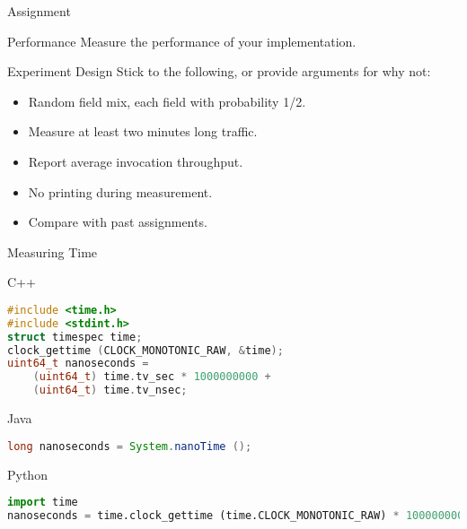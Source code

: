 \begin{frame}{Assignment}
    \begin{block}{Performance}
        Measure the performance of your implementation.
    \end{block}

    \bigskip

    \begin{block}{Experiment Design}
        Stick to the following, or provide arguments for why not:
        \begin{itemize}
            \item Random field mix, each field with probability 1/2.
            \item Measure at least two minutes long traffic.
            \item Report average invocation throughput.
            \item No printing during measurement.
            \item Compare with past assignments.
        \end{itemize}
    \end{block}
\end{frame}


\begin{frame}[fragile]{Measuring Time}
    \begin{block}{C++}
\begin{lstlisting}[language=c,style=mini]
#include <time.h>
#include <stdint.h>
struct timespec time;
clock_gettime (CLOCK_MONOTONIC_RAW, &time);
uint64_t nanoseconds =
    (uint64_t) time.tv_sec * 1000000000 +
    (uint64_t) time.tv_nsec;
\end{lstlisting}
    \end{block}
    \begin{block}{Java}
\begin{lstlisting}[language=java,style=mini]
long nanoseconds = System.nanoTime ();
\end{lstlisting}
    \end{block}
    \begin{block}{Python}
\begin{lstlisting}[language=python,style=mini]
import time
nanoseconds = time.clock_gettime (time.CLOCK_MONOTONIC_RAW) * 1000000000
\end{lstlisting}
    \end{block}
\end{frame}


